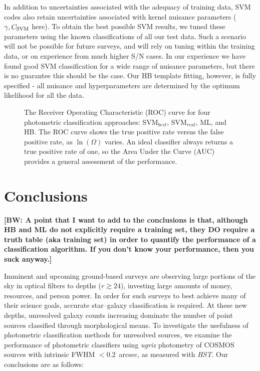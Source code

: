 \documentclass[12pt,preprint]{aastex}
\newcommand\bw[1]{{\bf [BW: #1]}}
\begin{document}
In addition to uncertainties associated with the adequacy of training
data, SVM codes also retain uncertainties associated with kernel
nuisance parameters ($\gamma,C_{\rm SVM}$ here).  To obtain the best
possible SVM results, we tuned these parameters using the known
classifications of all our test data.  Such a scenario will not be
possible for future surveys, and will rely on tuning within the
training data, or on experience from much higher S/N cases.  In our
experience we have found good SVM classification for a wide range of
nuisance parameters, but there is no guarantee this should be the
case.  Our HB template fitting, however, is fully specified - all
nuisance and hyperparameters are determined by the optimum likelihood
for all the data.


\begin{figure}
\centering
\caption{The Receiver Operating Characteristic (ROC) curve for four photometric 
classification approaches: SVM$_{best}$, SVM$_{real}$, ML, and HB.  The ROC curve 
shows the true positive rate versus the false positive rate, as $\ln(\Omega)$ varies.  An ideal classifier 
always returns a true positive rate of one, so the Area Under the Curve (AUC) provides a 
general assessment of the performance.}
\label{fig:roc}
\end{figure}



\section{Conclusions}

\bw{A point that I want to add to the conclusions is that, although HB and ML do not explicitly require a training set, they DO require a truth table (aka training set) in order to quantify the performance of a classification algorithm.  If you don't know your performance, then you suck anyway.}

Imminent and upcoming ground-based surveys are observing large
portions of the sky in optical filters to depths ($r\gtrsim24$),
investing large amounts of money, resources, and person power.  In
order for such surveys to best achieve many of their science goals,
accurate star--galaxy classification is required.  At these new
depths, unresolved galaxy counts increasing dominate the number of
point sources classified through morphological means.  To investigate
the usefulness of photometric classification methods for unresolved
sources, we examine the performance of photometric classifiers using
{\it ugriz} photometry of COSMOS sources with intrinsic FWHM $<0.2$~arcsec,
as measured with {\it HST}.  Our conclusions are as follows:
\end{document}
